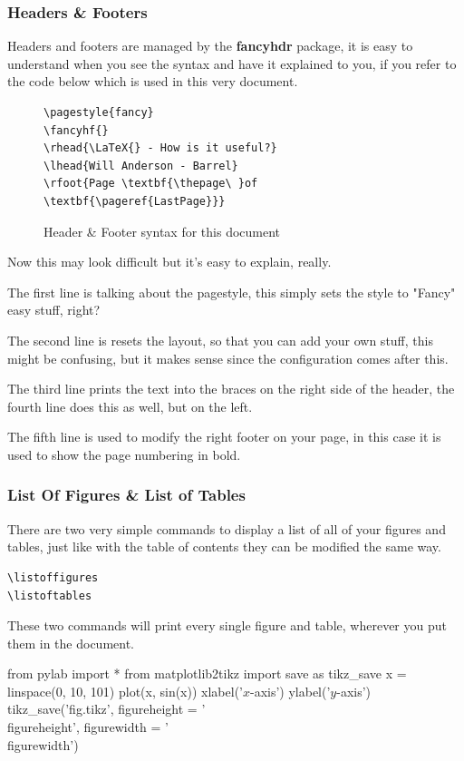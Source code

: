 \documentclass[12pt, letterpaper, oneside]{article} \usepackage[utf8]{inputenc}
\newlength\figureheight
\newlength\figurewidth
\begin{document}
\subsubsection{Headers \& Footers}

Headers and footers are managed by the \textbf{fancyhdr} package, it is easy to understand when you see the syntax and have it explained to you, if you refer to the code below which is used in this very document. 

\begin{figure}[H]
	\centering
	\begin{lstlisting}
\pagestyle{fancy}
\fancyhf{}
\rhead{\LaTeX{} - How is it useful?}
\lhead{Will Anderson - Barrel}
\rfoot{Page \textbf{\thepage\ }of \textbf{\pageref{LastPage}}}
\end{lstlisting}
	\caption{Header \& Footer syntax for this document}
\end{figure}

Now this may look difficult but it's easy to explain, really.

The first line is talking about the pagestyle, this simply sets the style to "Fancy" easy stuff, right? 

The second line is resets the layout, so that you can add your own stuff, this might be confusing, but it makes sense since the configuration comes after this.

The third line prints the text into the braces on the right side of the header, the fourth line does this as well, but on the left.

The fifth line is used to modify the right footer on your page, in this case it is used to show the page numbering in bold.

\subsubsection{List Of Figures \& List of Tables}

There are two very simple commands to display a list of all of your figures and tables, just like with the table of contents they can be modified the same way.

\begin{lstlisting}
\listoffigures
\listoftables
\end{lstlisting}

These two commands will print every single figure and table, wherever you put them in the document. 



\begin{pycode}
from pylab import *
from matplotlib2tikz import save as tikz_save
x = linspace(0, 10, 101)
plot(x, sin(x))
xlabel('$x$-axis')
ylabel('$y$-axis')
tikz_save('fig.tikz',
       figureheight = '\\figureheight',
       figurewidth = '\\figurewidth')
\end{pycode}
\end{document}
